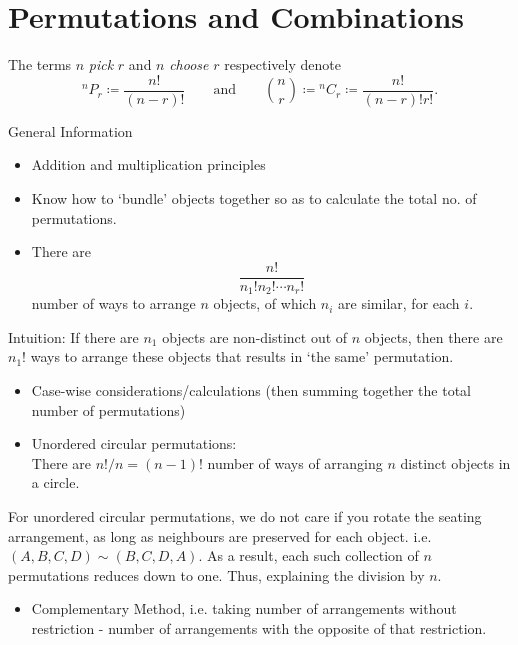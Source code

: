 \documentclass[oneside]{book}
\begin{document}
\chapter{Permutations and Combinations}
\begin{definition}{}{}
  The terms \(n\) \emph{pick} \(r\) and \(n\) \emph{choose} \(r\) respectively denote 
  \[{^n}P_r \coloneq  \frac{n!}{(n-r)!} \qquad\text{and}\qquad \binom{n}{r}\coloneq{^n}C_r\coloneq \frac{n!}{(n-r)!r!}.\]
\end{definition}
\begin{stbox}{General Information}
  \begin{itemize}
    \item Addition and multiplication principles
    \item Know how to `bundle' objects together so as to calculate the total no. of permutations.
    \item There are 
    \[\frac{n!}{n_1!n_2!\cdots n_r!}\]
    number of ways to arrange \(n\) objects, of which \(n_i\) are similar, for each \(i\).
  \end{itemize}
\end{stbox}
    \begin{fact}
      Intuition: If there are \(n_1\) objects are non-distinct out of \(n\) objects, then there are \(n_1!\) ways to arrange these objects that results in `the same' permutation.
    \end{fact}
  \begin{stbox}{}
  \begin{itemize}
    \item Case-wise considerations/calculations (then summing together the total number of permutations)
    \item Unordered circular permutations:\\
    There are \(n!/n=(n-1)!\) number of ways of arranging \(n\) distinct objects in a circle.
  \end{itemize}
\end{stbox}
    \begin{fact}
      For unordered circular permutations, we do not care if you rotate the seating arrangement, as long as neighbours are preserved for each object. i.e. \((A,B,C,D) \sim (B,C,D,A)\). As a result, each such collection of \(n\) permutations reduces down to one. Thus, explaining the division by \(n\).
    \end{fact}
\begin{stbox}{}
\begin{itemize}
    \item Complementary Method, i.e. taking number of arrangements without restriction - number of arrangements with the opposite of that restriction.
\end{itemize}
\end{stbox}
\end{document}
